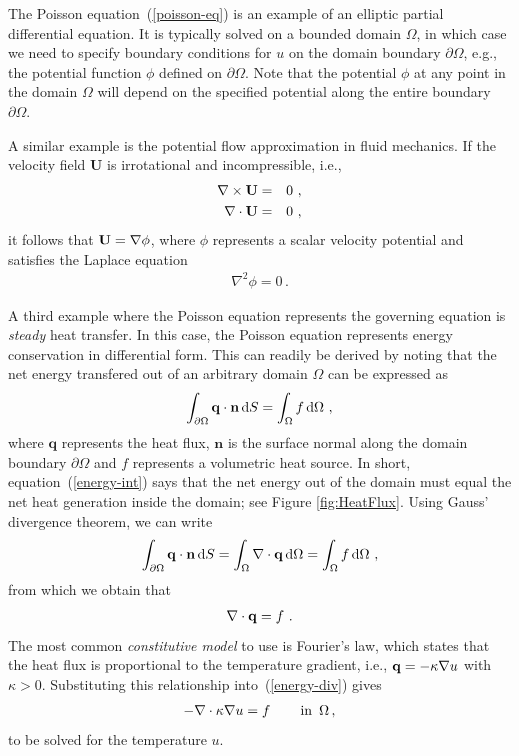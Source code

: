 \documentclass[11pt]{article}
\begin{document}
The Poisson equation~(\ref{poisson-eq}) is an example 
of an elliptic partial differential
equation. It is typically solved on a bounded domain $\Omega$, in
which case we need to specify boundary conditions for $u$ on the
domain boundary $\partial \Omega$, e.g., the potential function
$\phi$ defined on $\partial \Omega$. Note that the potential $\phi$
at any point in the domain $\Omega$ will depend on the specified 
potential along the entire boundary $\partial \Omega$.

A similar example is the potential flow approximation in fluid
mechanics. If the velocity field $\mathbf{U}$ is irrotational
and incompressible, i.e.,
\begin{eqnarray}
\nabla \times {\bf U} &=& 0  \,\, ,\\
\nabla \cdot  {\bf U} &=& 0  \,\, ,
\end{eqnarray}
it follows that ${\bf U}= \nabla \phi$, where $\phi$ 
represents a scalar velocity potential and satisfies the 
Laplace equation 
\begin{eqnarray}
\nabla^2 \phi = 0 \, .
\end{eqnarray}

A third example where the Poisson equation represents the governing
equation  is {\em steady} heat transfer. In this case, the Poisson 
equation represents energy conservation in differential form. 
This can readily be derived by noting that the net energy 
transfered out of an arbitrary domain $\Omega$ can be expressed as  
\begin{eqnarray} 
\label{energy-int}
\int_{\partial\Omega} {\bf q}\cdot {\bf n}\, \mathrm{d}S =
\int_{\Omega}f\, \mathrm{d}\Omega \,\, ,
\end{eqnarray}
where $\mathbf{q}$ represents the heat flux, $\mathbf{n}$ is the
surface normal along the domain boundary $\partial\Omega$ and 
$f$ represents a volumetric heat source. In short, equation~(\ref{energy-int})
says that the net energy out of the domain must equal the net 
heat generation inside the domain; see Figure \ref{fig:HeatFlux}. 
Using Gauss' divergence theorem,  we can write
\begin{eqnarray}
  \int_{\partial\Omega} {\bf q}\cdot {\bf n}\, \mathrm{d}S = 
  \int_{\Omega} \nabla \cdot {\bf q}\, \mathrm{d}\Omega = \int_{\Omega}f\,
  \mathrm{d}\Omega \,\, ,
\end{eqnarray}
from which we obtain that 
\begin{eqnarray} 
\label{energy-div}
\nabla \cdot {\bf q} = f \,\, .
\end{eqnarray}
The most common {\em constitutive model} to use is Fourier's law, which
states that the heat flux is proportional to the temperature gradient,
i.e., ${\bf q} = - \kappa \nabla u$ with $\kappa > 0$. Substituting this relationship
into~(\ref{energy-div}) gives 
\begin{eqnarray}
- \nabla\cdot\kappa\nabla u = f 
\hspace{0.3in}\mathrm{in}\,\,\,\Omega \, ,
\end{eqnarray}
to be solved for the temperature $u$. \\
\end{document}
